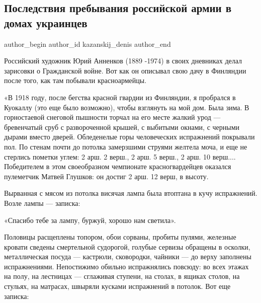  
 
 
 
 
 
\subsection{Последствия пребывания российской армии в домах украинцев}
\label{sec:12_04_2022.fb.kazanskij_denis.1.rosarmia_doma_ukraincev}
 
\ifcmt
 author_begin
   author_id kazanskij_denis
 author_end
\fi

Российский художник Юрий Анненков (1889 -1974) в своих дневниках делал
зарисовки о Гражданской войне. Вот как он описывал свою дачу в Финляндии после
того, как там побывали красноармейцы. 


«В 1918 году, после бегства красной гвардии из Финляндии, я пробрался в
Куокаллу (это еще было возможно), чтобы взглянуть на мой дом. Была зима. В
горностаевой снеговой пышности торчал на его месте жалкий урод — бревенчатый
сруб с развороченной крышей, с выбитыми окнами, с черными дырами вместо дверей.
Обледенелые горы человеческих испражнений покрывали пол. По стенам почти до
потолка замерзшими струями желтела моча, и еще не стерлись пометки углем: 2
арш. 2 верш., 2 арш. 5 верш., 2 арш. 10 верш.... Победителем в этом
своеобразном чемпионате красногвардейцев оказался пулеметчик Матвей Глушков: он
достиг 2 арш. 12 верш, в высоту.

Вырванная с мясом из потолка висячая лампа была втоптана в кучу испражнений.
Возле лампы — записка:

«Спасибо тебе за лампу, буржуй, хорошо нам светила».


Половицы расщеплены топором, обои сорваны, пробиты пулями, железные кровати
сведены смертельной судорогой, голубые сервизы обращены в осколки,
металлическая посуда — кастрюли, сковородки, чайники — до верху заполнены
испражнениями. Непостижимо обильно испражнялись повсюду: во всех этажах на
полу, на лестницах — сглаживая ступени, на столах, в ящиках столов, на стульях,
на матрасах, швыряли кусками испражнений в потолок. Вот еще записка:

